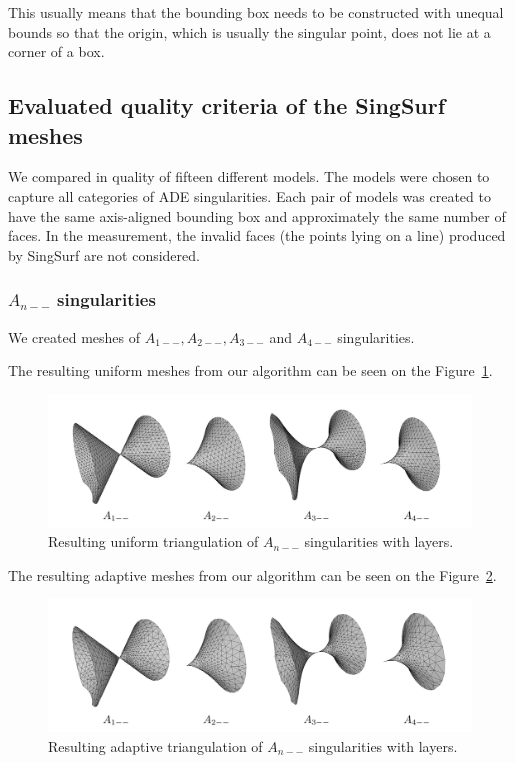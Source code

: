 This usually means that the bounding box needs to be constructed with unequal bounds 
so that the origin, which is usually the singular point, does not lie at a corner of a box.

\clearpage
\subsection{Evaluated quality criteria of the SingSurf meshes}
We compared in quality of fifteen different models. The models were chosen
to capture all categories of ADE singularities. Each pair of models was 
created to have the same axis-aligned bounding box and approximately the
same number of faces. In the measurement, the invalid faces 
(the points lying on a line) produced by SingSurf are not considered.

\subsubsection*{$A_{n--}$ singularities}
We created meshes of $A_{1--}, A_{2--}, A_{3--}$ and $A_{4--}$ singularities.

The resulting uniform meshes from our algorithm can be seen on the 
Figure~\ref{img:61}.
\begin{figure}[h!]
    \centerline{\includegraphics[scale=0.24]{images/img61}}
    \caption[Resulting uniform triangulation of $A_{n--}$ singularities]
    {Resulting uniform triangulation of $A_{n--}$ singularities with layers.}
    \label{img:61}
\end{figure} 

The resulting adaptive meshes from our algorithm can be seen on the 
Figure~\ref{img:60}.
\begin{figure}[h!]
    \centerline{\includegraphics[scale=0.5]{images/img60}}
    \caption[Resulting adaptive triangulation of $A_{n--}$ singularities]
    {Resulting adaptive triangulation of $A_{n--}$ singularities with layers.}
    \label{img:60}
\end{figure}

